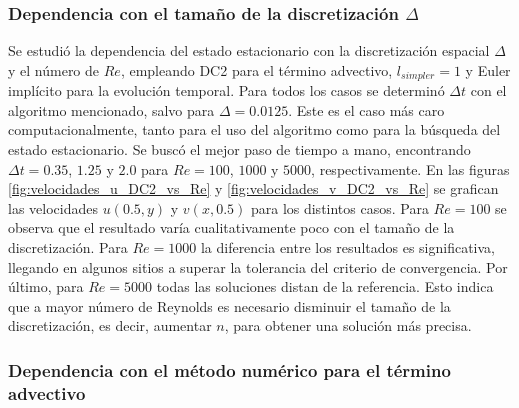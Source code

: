\documentclass[aps,prb,twocolumn,superscriptaddress,floatfix,longbibliography,10pt]{revtex4-2}
\newif\ifptitle
\newif\ifpnumber
\newcounter{para}
\newcommand\ptitle[1]{\par\refstepcounter{para}
{\ifpnumber{\noindent\textcolor{lightgray}{\textbf{\thepara}}\indent}\fi}
{\ifptitle{\textbf{[{#1}]}}\fi}}
\begin{document}

\subsubsection{Dependencia con el tamaño de la discretización $\Delta$}

\ptitle{Comparación DC2 vs n1 para distintos Re}
Se estudió la dependencia del estado estacionario con la discretización espacial $\Delta$ y el número de $Re$, empleando DC2 para el término advectivo, $l_{simpler} = 1$ y Euler implícito para la evolución temporal. Para todos los casos se determinó $\Delta t$ con el algoritmo mencionado, salvo para $\Delta = 0.0125$. Este es el caso más caro computacionalmente, tanto para el uso del algoritmo como para la búsqueda del estado estacionario. Se buscó el mejor paso de tiempo a mano, encontrando $\Delta t = 0.35$, $1.25$ y $2.0$ para $Re = 100$, $1000$ y $5000$, respectivamente. En las figuras \ref{fig:velocidades_u_DC2_vs_Re} y \ref{fig:velocidades_v_DC2_vs_Re} se grafican las velocidades $u(0.5,y)$ y $v(x,0.5)$ para los distintos casos. Para $Re = 100$ se observa que el resultado varía cualitativamente poco con el tamaño de la discretización. Para $Re = 1000$ la diferencia entre los resultados es significativa, llegando en algunos sitios a superar la tolerancia del criterio de convergencia. Por último, para $Re = 5000$ todas las soluciones distan de la referencia. Esto indica que a mayor número de Reynolds es necesario disminuir el tamaño de la discretización, es decir, aumentar $n$, para obtener una solución más precisa.

\subsubsection{Dependencia con el método numérico para el término advectivo \label{sec:termino_adv}}
\end{document}
